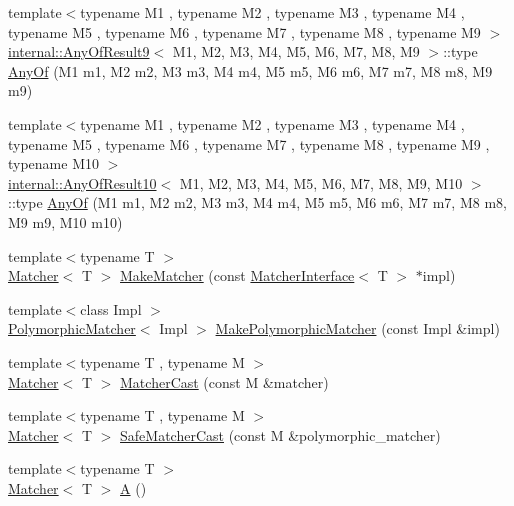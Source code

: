 \begin{DoxyCompactItemize}
\item 
{\footnotesize template$<$typename M1 , typename M2 , typename M3 , typename M4 , typename M5 , typename M6 , typename M7 , typename M8 , typename M9 $>$ }\\\hyperlink{structtesting_1_1internal_1_1_any_of_result9}{internal\+::\+Any\+Of\+Result9}$<$ M1, M2, M3, M4, M5, M6, M7, M8, M9 $>$\+::type \hyperlink{namespacetesting_a873c812db953aebd4bf2ffbff0e8d770}{Any\+Of} (M1 m1, M2 m2, M3 m3, M4 m4, M5 m5, M6 m6, M7 m7, M8 m8, M9 m9)
\item 
{\footnotesize template$<$typename M1 , typename M2 , typename M3 , typename M4 , typename M5 , typename M6 , typename M7 , typename M8 , typename M9 , typename M10 $>$ }\\\hyperlink{structtesting_1_1internal_1_1_any_of_result10}{internal\+::\+Any\+Of\+Result10}$<$ M1, M2, M3, M4, M5, M6, M7, M8, M9, M10 $>$\+::type \hyperlink{namespacetesting_a1797921d3ed04c7f13dfa8f36bf0bf1c}{Any\+Of} (M1 m1, M2 m2, M3 m3, M4 m4, M5 m5, M6 m6, M7 m7, M8 m8, M9 m9, M10 m10)
\item 
{\footnotesize template$<$typename T $>$ }\\\hyperlink{classtesting_1_1_matcher}{Matcher}$<$ T $>$ \hyperlink{namespacetesting_a37fd8029ac00e60952440a3d9cca8166}{Make\+Matcher} (const \hyperlink{classtesting_1_1_matcher_interface}{Matcher\+Interface}$<$ T $>$ $\ast$impl)
\item 
{\footnotesize template$<$class Impl $>$ }\\\hyperlink{classtesting_1_1_polymorphic_matcher}{Polymorphic\+Matcher}$<$ Impl $>$ \hyperlink{namespacetesting_a667ca94f190ec2e17ee2fbfdb7d3da04}{Make\+Polymorphic\+Matcher} (const Impl \&impl)
\item 
{\footnotesize template$<$typename T , typename M $>$ }\\\hyperlink{classtesting_1_1_matcher}{Matcher}$<$ T $>$ \hyperlink{namespacetesting_a8234d15eee99b135a7fdf2141a2ebe1f}{Matcher\+Cast} (const M \&matcher)
\item 
{\footnotesize template$<$typename T , typename M $>$ }\\\hyperlink{classtesting_1_1_matcher}{Matcher}$<$ T $>$ \hyperlink{namespacetesting_ac016ac22aa065a19b9ef95f0ccffc17b}{Safe\+Matcher\+Cast} (const M \&polymorphic\+\_\+matcher)
\item 
{\footnotesize template$<$typename T $>$ }\\\hyperlink{classtesting_1_1_matcher}{Matcher}$<$ T $>$ \hyperlink{namespacetesting_a5e9134d655d2fc9323902348083282e7}{A} ()

\end{DoxyCompactItemize}
